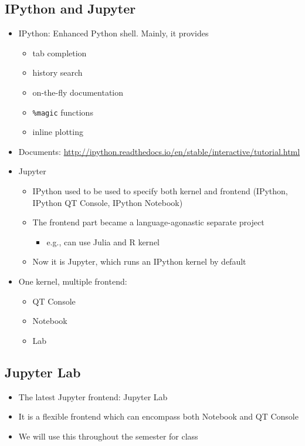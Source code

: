 \documentclass[10pt,article]{article}
\begin{document}
\subsection{IPython and Jupyter}
\label{sec:org3fa5aef}
\begin{itemize}
\item IPython: Enhanced Python shell. Mainly, it provides

\begin{itemize}
\item tab completion
\item history search
\item on-the-fly documentation
\item \texttt{\%magic} functions
\item inline plotting
\end{itemize}
\end{itemize}

\begin{itemize}
\item Documents: \url{http://ipython.readthedocs.io/en/stable/interactive/tutorial.html}
\end{itemize}
\begin{itemize}
\item Jupyter
\begin{itemize}
\item IPython used to be used to specify both kernel and frontend (IPython,
IPython QT Console, IPython Notebook)
\item The frontend part became a language-agonastic separate project
\begin{itemize}
\item e.g., can use Julia and R kernel
\end{itemize}
\item Now it is Jupyter, which runs an IPython kernel by default
\end{itemize}
\end{itemize}

\begin{itemize}
\item One kernel, multiple frontend:
\begin{itemize}
\item QT Console
\item Notebook
\item Lab
\end{itemize}
\end{itemize}
\subsection{Jupyter Lab}
\label{sec:org2ed6766}
\begin{itemize}
\item The latest Jupyter frontend: Jupyter Lab
\item It is a flexible frontend which can encompass both Notebook and QT Console
\item We will use this throughout the semester for class
\end{itemize}
\end{document}
